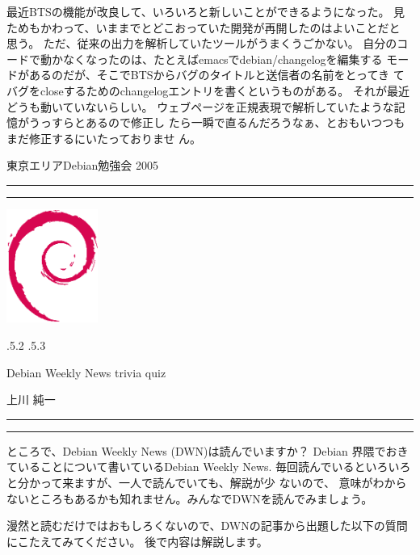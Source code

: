 \documentclass[mingoth,a4paper]{jsarticle}
\makeatletter
\renewcommand{\section}{\@startsection{section}{1}{\z@}%
    {\Cvs \@plus.5\Cdp \@minus.2\Cdp}%
    {.5\Cvs \@plus.3\Cdp}%
    {\normalfont\Large\headfont\raggedright\centering}} %
\newcommand{\dancersection}[2]{%
\newpage
東京エリアDebian勉強会 2005
\hrule
\vspace{0.5mm}
\hrule
\hfill{}\includegraphics[width=3cm]{image200502/openlogo-nd.eps}\\
\vspace{-4cm}
\begin{center}
  \section{#1}
\end{center}
\hfill{}#2\hspace{3cm}\space\\
\hrule
\hrule
\vspace{1cm}
}
\makeatother
\begin{document}
最近BTSの機能が改良して、いろいろと新しいことができるようになった。
見ためもかわって、いままでとどこおっていた開発が再開したのはよいことだと
思う。
ただ、従来の出力を解析していたツールがうまくうごかない。
自分のコードで動かなくなったのは、たとえばemacsでdebian/changelogを編集する
モードがあるのだが、そこでBTSからバグのタイトルと送信者の名前をとってき
てバグをcloseするためのchangelogエントリを書くというものがある。
それが最近どうも動いていないらしい。
ウェブページを正規表現で解析していたような記憶がうっすらとあるので修正し
たら一瞬で直るんだろうなぁ、とおもいつつもまだ修正するにいたっておりませ
ん。


\dancersection{Debian Weekly News trivia quiz}{上川 純一}

ところで、Debian Weekly News (DWN)は読んでいますか？
Debian 界隈でおきていることについて書いているDebian Weekly News.
毎回読んでいるといろいろと分かって来ますが、一人で読んでいても、解説が少
ないので、
意味がわからないところもあるかも知れません。みんなでDWNを読んでみましょう。

漫然と読むだけではおもしろくないので、DWNの記事から出題した以下の質問にこたえてみてください。
後で内容は解説します。
\end{document}
